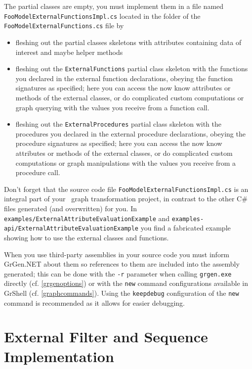 \noindent The partial classes are empty, you must implement them in a file named \texttt{FooModelExternal\-FunctionsImpl.cs} located in the folder of the \texttt{FooModelExternalFunctions.cs} file by
\begin{itemize}
	\item fleshing out the partial classes skeletons with attributes containing data of interest and maybe helper methods
	\item fleshing out the \texttt{ExternalFunctions} partial class skeleton with the functions you declared in the external function declarations, obeying the function signatures as specified; here you can access the now know attributes or methods of the external classes, or do complicated custom computations or graph querying with the values you receive from a function call.
	\item fleshing out the \texttt{ExternalProcedures} partial class skeleton with the procedures you declared in the external procedure declarations, obeying the procedure signatures as specified; here you can access the now know attributes or methods of the external classes, or do complicated custom computations or graph manipulations with the values you receive from a procedure call.
\end{itemize}

\noindent Don't forget that the source code file \texttt{FooModelExternalFunctionsImpl.cs} is an integral part of your \GrG~graph transformation project, in contrast to the other C\# files generated (and overwritten) for you.
In \texttt{examples/ExternalAttributeEvaluationExample} and \texttt{examples-api/ExternalAttributeEvaluationExample}
you find a fabricated example showing how to use the external classes and functions.

When you use third-party assemblies in your source code you must inform GrGen.NET about them so references to them are included into the assembly generated; this can be done with the \texttt{-r} parameter when calling \texttt{grgen.exe} directly (cf. \ref{grgenoptions}) or with the \texttt{new} command configurations available in GrShell (cf. \ref{graphcommands}). Using the \texttt{keepdebug} configuration of the \texttt{new} command is recommended as it allows for easier debugging.


\section{External Filter and Sequence Implementation}\label{sub:extfltseqimpl}

